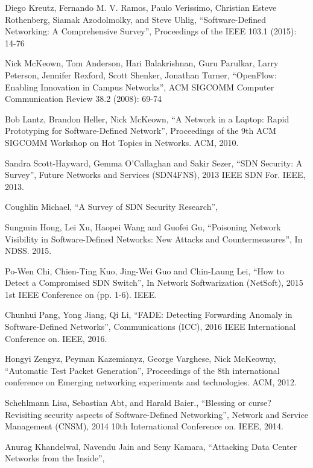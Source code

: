 \begin{thebibliography}{1}

Diego Kreutz, Fernando M. V. Ramos, Paulo Verissimo, Christian Esteve Rothenberg, Siamak Azodolmolky, 
and Steve Uhlig,
``Software-Defined Networking: A Comprehensive Survey'', Proceedings of the IEEE 103.1 (2015): 14-76

Nick McKeown, Tom Anderson, Hari Balakrishnan, Guru Parulkar, Larry Peterson, Jennifer Rexford, Scott Shenker, Jonathan Turner,
``OpenFlow: Enabling Innovation in Campus Networks'', ACM SIGCOMM Computer Communication Review 38.2 (2008): 69-74

Bob Lantz, Brandon Heller, Nick McKeown,
``A Network in a Laptop: Rapid Prototyping for Software-Defined Network'', Proceedings of the 9th ACM SIGCOMM Workshop on Hot Topics in Networks. ACM, 2010.

Sandra Scott-Hayward, Gemma O’Callaghan and Sakir Sezer,
``SDN Security: A Survey'', Future Networks and Services (SDN4FNS), 2013 IEEE SDN For. IEEE, 2013.

Coughlin Michael,
``A Survey of SDN Security Research'',

Sungmin Hong, Lei Xu, Haopei Wang and Guofei Gu,
``Poisoning Network Visibility in Software-Defined Networks: New Attacks and Countermeasures'', In NDSS. 2015.

Po-Wen Chi, Chien-Ting Kuo, Jing-Wei Guo and Chin-Laung Lei,
``How to Detect a Compromised SDN Switch'', In Network Softwarization (NetSoft), 2015 1st IEEE Conference on (pp. 1-6). IEEE.

Chunhui Pang, Yong Jiang, Qi Li,
``FADE: Detecting Forwarding Anomaly in Software-Defined Networks'', Communications (ICC), 2016 IEEE International Conference on. IEEE, 2016.

Hongyi Zengyz, Peyman Kazemianyz, George Varghese, Nick McKeowny,
``Automatic Test Packet Generation'', Proceedings of the 8th international conference on Emerging networking experiments and technologies. ACM, 2012.

Schehlmann Lisa, Sebastian Abt, and Harald Baier., 
``Blessing or curse? Revisiting security aspects of Software-Defined Networking'', Network and Service Management (CNSM), 2014 10th International Conference on. IEEE, 2014.

Anurag Khandelwal, Navendu Jain and Seny Kamara,
``Attacking Data Center Networks from the Inside'', 


\end{thebibliography}
